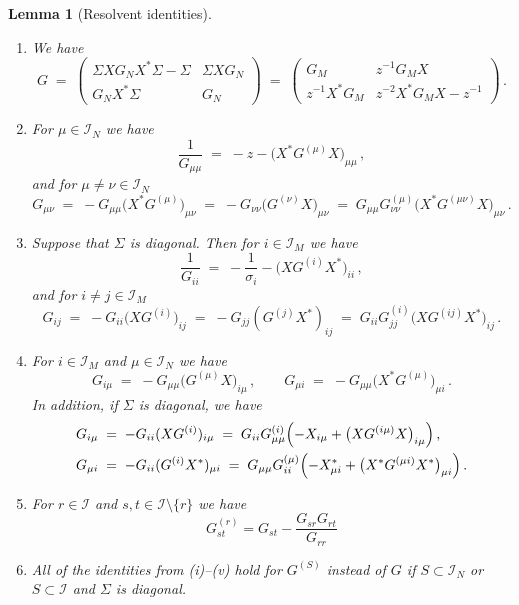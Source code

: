 \documentclass[11pt]{article} %
\numberwithin{equation}{section}
\numberwithin{figure}{section}
\theoremstyle{plain} %
\newtheorem{lemma}[theorem]{Lemma}
\theoremstyle{definition} %
\renewcommand{\cal}{\mathcal}
\newcommand{\pb}[1]{\bigl({#1}\bigr)}
\newcommand{\pB}[1]{\Bigl({#1}\Bigr)}
\newcommand{\be}{\begin{equation}}
\newcommand{\ee}{\end{equation}}
\begin{document}
\begin{lemma}[Resolvent identities]\label{lem:idG}
\begin{enumerate}
\item
We have
\begin{equation}\label{G=G}
G \;=\;
\begin{pmatrix}
\Sigma X G_N X^* \Sigma - \Sigma & \Sigma X G_N
\\
G_N X^* \Sigma & G_N
\end{pmatrix} 
\;=\;
\begin{pmatrix}
G_M & z^{-1} G_M X
\\
z^{-1} X^* G_M & z^{-2} X^* G_M X - z^{-1}
\end{pmatrix}\,.
\end{equation}
\item
For $\mu \in \cal I_N$ we have
\be
\label{Gii}
\frac{1}{G_{\mu \mu}} \;=\; -z - \pb{X^* G^{(\mu)} X}_{\mu\mu}\,,
\ee
and for $\mu \neq \nu \in \cal I_N$
\begin{equation} \label{Gij}
G_{\mu \nu} \;=\; -G_{\mu\mu} \pb{X^* G^{(\mu)}}_{\mu \nu}  \;=\; -G_{\nu \nu} \pb{G^{(\nu)} X}_{\mu \nu} \;=\; G_{\mu \mu}G_{\nu \nu}^{(\mu)} \pb{X^* G^{(\mu \nu)} X}_{\mu \nu}\,.
\end{equation}
\item
Suppose that $\Sigma$ is diagonal.
Then for $i \in \cal I_M$ we have
\begin{equation} \label{Gaa}
\frac{1}{G_{i i}} \;=\; - \frac{1}{\sigma_i} - \pb{X G^{(i)} X^*}_{i i}\,,
\end{equation}
and for $i \neq j \in \cal I_M$
\begin{equation} \label{Gab}
G_{ij} \;=\; -G_{ii} \pb{X G^{(i)}}_{i j} \;=\; -G_{jj} (G^{(j)} X^*)_{ij} \;=\; G_{ii} G_{jj}^{(i)} \pb{X G^{(ij)} X^*}_{ij}\,.
\end{equation}
\item
For $i \in \cal I_M$ and $\mu \in \cal I_N$ we have
\be\label{Gia}
G_{i \mu} \;=\; - G_{\mu \mu} \pb{G^{(\mu)} X}_{i \mu}\,, \qquad G_{\mu i} \;=\; - G_{\mu \mu}  \pb{X^* G^{(\mu)}}_{\mu i}\,.
\ee
In addition, if $\Sigma$ is diagonal, we have
\begin{align} \label{Gia2}
G_{i \mu} &\;=\; -G_{ii} (X G^{(i)})_{i \mu} \;=\; G_{ii} G_{\mu \mu}^{(i)} \pB{-X_{i \mu} + \pb{X G^{(i \mu)} X}_{i \mu}} \,,
\\ \label{Gia3}
G_{\mu i} &\;=\; - G_{ii} (G^{(i)} X^*)_{\mu i} \;=\; G_{\mu \mu} G_{ii}^{(\mu)} \pB{- X_{\mu i}^* + \pb{X^* G^{(\mu i)} X^*}_{\mu i}}\,.
\end{align}

\item
For $r \in \cal I$ and $s,t \in \cal I \setminus \{r\}$ we have
\be\label{Gstu}
G_{st}^{(r)}=G_{st}-\frac{G_{sr}G_{rt}}{G_{rr}}
\ee
\item
All of the identities from (i)--(v) hold for $G^{(S)}$ instead of $G$ if $S \subset \cal I_N$ or $S \subset \cal I$ and $\Sigma$ is diagonal.
\end{enumerate}
\end{lemma}
\end{document}
